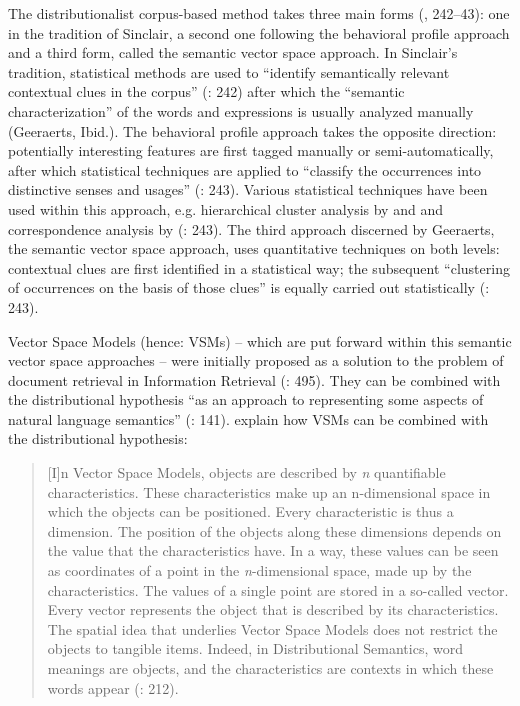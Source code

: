 The distributionalist corpus-based method takes three main forms (\citealt{riemer_sense_2016}, 242–43): one in the tradition of Sinclair, a second one following the behavioral profile approach and a third form, called the semantic vector space approach. In Sinclair’s tradition, statistical methods are used to “identify semantically relevant contextual clues in the corpus” (\citealt{riemer_sense_2016}: 242) after which the “semantic characterization” of the words and expressions is usually analyzed manually (Geeraerts, Ibid.). The behavioral profile approach takes the opposite direction: potentially interesting features are first tagged manually or semi-automatically, after which statistical techniques are applied to “classify the occurrences into distinctive senses and usages” (\citealt{riemer_sense_2016}: 243). Various statistical techniques have been used within this approach, e.g. hierarchical cluster analysis by  \citet{Gries2006b} and \citet{divjak_structuring_2010} and correspondence analysis by \citet{glynn_empirical_2010} (\citealt{riemer_sense_2016}: 243). The third approach discerned by Geeraerts, the semantic vector space approach, uses quantitative techniques on both levels: contextual clues are first identified in a statistical way; the subsequent “clustering of occurrences on the basis of those clues” is equally carried out statistically (\citealt{riemer_sense_2016}: 243).



Vector Space Models (hence: VSMs) – which are put forward within this semantic vector space approaches – were initially proposed as a solution to the problem of document retrieval in Information Retrieval (\citealt{lappin_vector_2015}: 495). They can be combined with the distributional hypothesis “as an approach to representing some aspects of natural language semantics” (\citealt{turney_frequency_2010}: 141). \citet[212]{szmrecsanyi_semantic_2014} explain how VSMs can be combined with the distributional hypothesis:


\begin{quote}
[I]n Vector Space Models, objects are described by \textit{n} quantifiable characteristics. These characteristics make up an n{}-dimensional space in which the objects can be positioned. Every characteristic is thus a dimension. The position of the objects along these dimensions depends on the value that the characteristics have. In a way, these values can be seen as coordinates of a point in the \textit{n}{}-dimensional space, made up by the characteristics. The values of a single point are stored in a so-called vector. Every vector represents the object that is described by its characteristics. The spatial idea that underlies Vector Space Models does not restrict the objects to tangible items. Indeed, in Distributional Semantics, word meanings are objects, and the characteristics are contexts in which these words appear (\citealt{szmrecsanyi_semantic_2014}: 212).
\end{quote}


